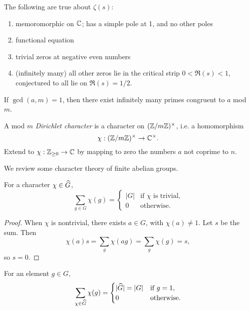 \documentclass[11pt]{amsart}
\begin{document}
\begin{prop}
    The following are true about $\zeta(s)$:

    \begin{enumerate}
        \item memoromorphic on $\mathbb{C}$; has a simple pole at 1, and no other poles

        \item functional equation 
        \item trivial zeros at negative even numbers
        \item (infinitely many) all other zeros lie in the critical strip $0 < \Re(s) < 1$, conjectured to all lie on $\Re(s) = 1/2$.
    \end{enumerate}
\end{prop}


\begin{thm}[Dirichlet]
\label{dirichlet}
    If $\gcd(a,m) = 1$, then there exist infinitely many primes congruent to $a$ mod $m$.
\end{thm}


\begin{defn}
    A mod $m$ \emph{Dirichlet character} is a character on $(\mathbb{Z}/m\mathbb{Z})^{\times}$, i.e. a homomorphism
    \[\chi: (\mathbb{Z}/m\mathbb{Z})^{\times} \to \mathbb{C}^{\times}.\]
    Extend to $\chi: \mathbb{Z}_{\ge 0}\to \mathbb{C}$ by mapping to zero the numbers $a$ not coprime to $n$.
\end{defn}


We review some character theory of finite abelian groups.

\begin{prop}
    For a character $\chi\in \widehat{G}$,
    \[\sum_{g\in G} \chi(g) = \begin{cases}
    |G| & \text{if } \chi \text{ is trivial,}\\
    0 & \text{otherwise}.
    \end{cases}\]
\end{prop}

\begin{proof}
    When $\chi$ is nontrivial, there exists $a\in G$, with $\chi(a)\neq 1$. Let $s$ be the sum. Then
    \[\chi(a)s = \sum_g \chi(ag) = \sum_g \chi(g) = s,\]
    so $s = 0$.
\end{proof}

\begin{prop}
    For an element $g\in G$,
    \[\sum_{\chi\in \widehat{G}} \chi(g) = \begin{cases}
    |\widehat{G}| = |G| & \text{if } g=1,\\
    0 & \text{otherwise}.
    \end{cases}\]
\end{prop}
\end{document}
